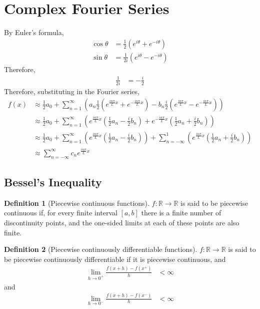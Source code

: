 \documentclass[fleqn, a4paper, 12pt, twoside]{article}
\theoremstyle{definition}
\newtheorem{definition}{Definition}
\theoremstyle{theorem}
\begin{document}
\section{Complex Fourier Series}

By Euler's formula,
\begin{align*}
	\cos \theta &= \frac{1}{2} \left( e^{i \theta} + e^{-i \theta} \right)\\
	\sin \theta &= \frac{1}{2 i} \left( e^{i \theta} - e^{-i \theta} \right)
\end{align*}
Therefore,
\begin{align*}
	\frac{1}{2 i} &= -\frac{i}{2}
\end{align*}
Therefore, substituting in the Fourier series,
\begin{align*}
	f(x) &\approx \frac{1}{2} a_0 + \sum\limits_{n = 1}^{\infty} \left( a_n \frac{1}{2} \left( e^{\frac{i n \pi}{L} x} + e^{-\frac{i n \pi}{L} x} \right) - b_n \frac{i}{2} \left( e^{\frac{i n \pi}{L} x} - e^{-\frac{i n \pi}{L} x} \right) \right)\\
	&\approx \frac{1}{2} a_0 + \sum\limits_{n = 1}^{\infty} \left( e^{\frac{i n \pi}{L} x} \left( \frac{1}{2} a_n - \frac{i}{2} b_n \right) + e^{-\frac{i n \pi}{L} x} \left( \frac{1}{2} a_n + \frac{i}{2} b_n \right) \right)\\
	&\approx \frac{1}{2} a_0 + \sum\limits_{n = 1}^{\infty} \left( e^{\frac{i n \pi}{L} x} \left( \frac{1}{2} a_n - \frac{i}{2} b_n \right) \right) + \sum\limits_{n = -\infty}^{1} \left( e^{\frac{i n \pi}{L} x} \left( \frac{1}{2} a_n + \frac{i}{2} b_n \right) \right)\\
	&\approx \sum\limits_{n = -\infty}^{\infty} c_n e^{\frac{i n \pi}{L} x}
\end{align*}

\subsection{Bessel's Inequality}

\begin{definition}[Piecewise continuous functions]
	$f : \mathbb{R} \to \mathbb{R}$ is said to be piecewise continuous if, for every finite interval $[a,b]$ there is a finite number of discontinuity points, and the one-sided limits at each of these points are also finite.
\end{definition}

\begin{definition}[Piecewise continuously differentiable functions]
	$f : \mathbb{R} \to \mathbb{R}$ is said to be piecewise continuously differentiable if it is piecewise continuous, and
	\begin{align*}
		\lim\limits_{h \to 0^+} \frac{f(x + h) - f(x^+)}{h} &< \infty
	\end{align*}
	and
	\begin{align*}
		\lim\limits_{h \to 0^-} \frac{f(x + h) - f(x^-)}{h} &< \infty
	\end{align*}
\end{definition}
\end{document}
